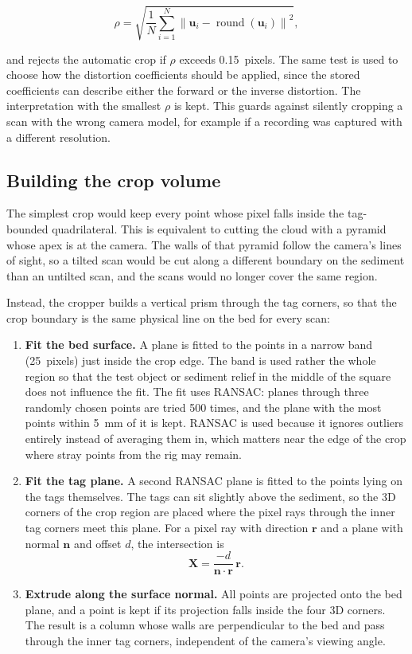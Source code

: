 \begin{equation}
	\rho = \sqrt{\frac{1}{N}\sum_{i=1}^{N}\left\lVert \mathbf{u}_i -
		\operatorname{round}(\mathbf{u}_i)\right\rVert^2},
\end{equation}

and rejects the automatic crop if $\rho$ exceeds 0.15~pixels. The same test is used to choose how the distortion coefficients should be applied, since the stored coefficients can describe either the forward or the inverse distortion. The interpretation with the smallest $\rho$ is kept. This guards against silently cropping a scan with the wrong camera model, for example if a recording was captured with a different resolution.

\subsection{Building the crop volume}

The simplest crop would keep every point whose pixel falls inside the tag-bounded quadrilateral. This is equivalent to cutting the cloud with a pyramid whose apex is at the camera. The walls of that pyramid follow the camera's lines of sight, so a tilted scan would be cut along a different boundary on the sediment than an untilted scan, and the scans would no longer cover the same region.

Instead, the cropper builds a vertical prism through the tag corners, so that the crop boundary is the same physical line on the bed for every scan:

\begin{enumerate}
	\item \textbf{Fit the bed surface.} A plane is fitted to the points in a narrow band (25~pixels) just inside the crop edge. The band is used rather the whole region so that the test object or sediment relief in the middle of the square does not influence the fit. The fit uses RANSAC: planes through three randomly chosen points are tried 500 times, and the plane with the most points within 5~mm of it is kept. RANSAC is used because it ignores outliers entirely  instead of averaging them in, which matters near the edge of the crop where stray points from the rig may remain.
	\item \textbf{Fit the tag plane.} A second RANSAC plane is fitted to the points lying on the tags themselves. The tags can sit slightly above the sediment, so the 3D corners of the crop region are placed where the pixel rays through the inner tag corners meet this plane. For a pixel ray with direction $\mathbf{r}$ and a plane with normal $\mathbf{n}$ and offset $d$, the intersection is
	\begin{equation}
		\mathbf{X} = \frac{-d}{\mathbf{n}\cdot\mathbf{r}}\,\mathbf{r}.
	\end{equation}
	\item \textbf{Extrude along the surface normal.} All points are projected onto the bed plane, and a point is kept if its projection falls inside the four 3D corners. The result is a column whose walls are perpendicular to the bed and pass through the inner tag corners, independent of the camera's viewing angle.
\end{enumerate}

